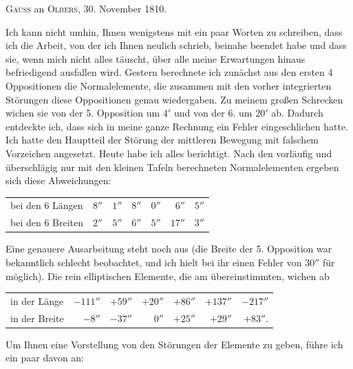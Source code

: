 \par\bigskip
\begin{center}
\textsc{Gauss} an \textsc{Olbers}, 30. November 1810.
\end{center}
\noindent\hspace*{\parindent}Ich kann nicht umhin, Ihnen wenigstens mit ein paar Worten zu schreiben, dass ich die Arbeit, von der ich Ihnen neulich schrieb, beinahe beendet habe und dass sie, wenn mich nicht alles täuscht, über alle meine Erwartungen hinaus befriedigend ausfallen wird. Gestern berechnete ich zunächst aus den ersten 4 Oppositionen die Normalelemente, die zusammen mit den vorher integrierten Störungen diese Oppositionen genau wiedergaben. Zu meinem großen Schrecken wichen sie von der 5. Opposition um \(4'\) und von der 6. um \(20'\) ab. Dadurch entdeckte ich, dass sich in meine ganze Rechnung ein Fehler eingeschlichen hatte. Ich hatte den Hauptteil der Störung der mittleren Bewegung mit falschem Vorzeichen angesetzt. Heute habe ich alles berichtigt. Nach den vorläufig und überschlägig nur mit den kleinen Tafeln berechneten Normalelementen ergeben sich diese Abweichungen:
\begin{center}\begingroup\small\setlength{\tabcolsep}{4pt}
\begin{tabular}{lrrrrrr}
bei den 6 Längen & \(8''\) & \(1''\) & \(8''\) & \(0''\) & \(6''\) & \(5''\)\\
bei den 6 Breiten & \(2''\) & \(5''\) & \(6''\) & \(5''\) & \(17''\) & \(3''\)\\
\end{tabular}\endgroup\end{center}
Eine genauere Ausarbeitung steht noch aus (die Breite der 5. Opposition war bekanntlich schlecht beobachtet, und ich hielt bei ihr einen Fehler von \(30''\) für möglich). Die rein elliptischen Elemente, die am  übereinstimmten, wichen ab
\begin{center}\begingroup\small\setlength{\tabcolsep}{4pt}
\begin{tabular}{lrrrrrr}
in der Länge & \(-111''\) & \(+59''\) & \(+20''\) & \(+86''\) & \(+137''\) & \(-217''\)\\
in der Breite & \(-8''\) & \(-37''\) & \(0''\) & \(+25''\) & \(+29''\) & \(+83''.\)\\
\end{tabular}\endgroup\end{center}
\par
\noindent\hspace*{\parindent}Um Ihnen eine Vorstellung von den Störungen der Elemente zu geben, führe ich ein paar davon an:
